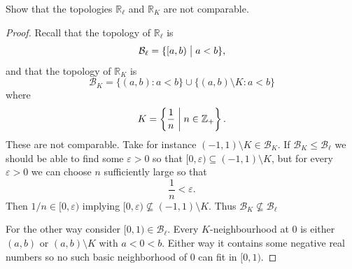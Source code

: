 \documentclass[11pt]{article}
\begin{document}
\begin{prob}[Problem 6]
    Show that the topologies $\mathbb R_\ell$ and $\mathbb R_K$ 
    are not comparable. 
\end{prob}
\begin{proof}
    Recall that the topology of $\mathbb R_\ell$ is 
    \[
        \mathcal B_\ell = \{[a,b) \bigm| a < b\},
    \]
    and that the topology of $\mathbb R_K$ is 
    \[
        \mathcal B_K = \{(a,b) : a < b\} \cup \{(a,b) \setminus K 
        : a < b\} 
    \]
    where 
    \[
        K = \left\{\frac{1}{n} \biggm| n \in \mathbb Z_+\right\}.
    \]
    These are not comparable. Take for instance 
    $(-1,1) \setminus K \in \mathcal B_K$. If $\mathcal B_K \leq 
    \mathcal B_\ell$ we should be able to find some $\varepsilon > 0$ so that 
    $[0,\varepsilon) \subseteq (-1,1) \setminus K$, but 
    for every $\varepsilon > 0$ we can choose $n$ sufficiently large 
    so that 
    \[
        \frac{1}{n} < \varepsilon. 
    \]
    Then $1/n \in [0,\varepsilon)$ implying $[0,\varepsilon) \not\subseteq 
    (-1,1) \setminus K$. Thus $\mathcal B_K \not\subseteq \mathcal B_\ell$ 

    For the other way consider $[0,1) \in \mathcal B_\ell$. 
    Every $K$-neighbourhood at $0$ is either $(a,b)$ or $(a,b) \setminus K$ 
    with $a < 0 < b$. Either way it contains some negative real numbers so 
    no such basic neighborhood of $0$ can fit in $[0,1)$. 
\end{proof}
\end{document}
